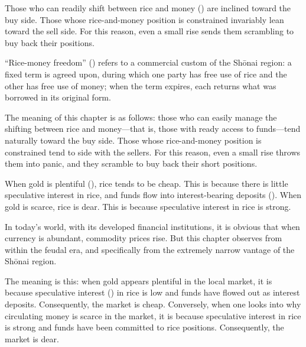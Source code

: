 
\begin{sokyubox}
{\small\itshape\color{sokyubar} }

\medskip
Those who can readily shift between rice and money ()
are inclined toward the buy side. Those whose rice-and-money position is
constrained invariably lean toward the sell side. For this reason, even a
small rise sends them scrambling to buy back their positions.
\end{sokyubox}

\commentary
``Rice-money freedom'' () refers to a commercial
custom of the Sh\=onai region: a fixed term is agreed upon, during which
one party has free use of rice and the other has free use of money; when
the term expires, each returns what was borrowed in its original form.

The meaning of this chapter is as follows: those who can easily manage the
shifting between rice and money---that is, those with ready access to
funds---tend naturally toward the buy side. Those whose rice-and-money
position is constrained tend to side with the sellers. For this reason,
even a small rise throws them into panic, and they scramble to buy back
their short positions.


\begin{sokyubox}
{\small\itshape\color{sokyubar} }

\medskip
When gold is plentiful (), rice tends to be
cheap. This is because there is little speculative interest in rice, and
funds flow into interest-bearing deposits (). When gold
is scarce, rice is dear. This is because speculative interest in rice is
strong.
\end{sokyubox}

\commentary
In today's world, with its developed financial institutions, it is obvious
that when currency is abundant, commodity prices rise. But this chapter
observes from within the feudal era, and specifically from the extremely
narrow vantage of the Sh\=onai region.

The meaning is this: when gold appears plentiful in the local market, it is
because speculative interest () in rice is low and funds
have flowed out as interest deposits. Consequently, the market is cheap.
Conversely, when one looks into why circulating money is scarce in the
market, it is because speculative interest in rice is strong and funds have
been committed to rice positions. Consequently, the market is dear.

